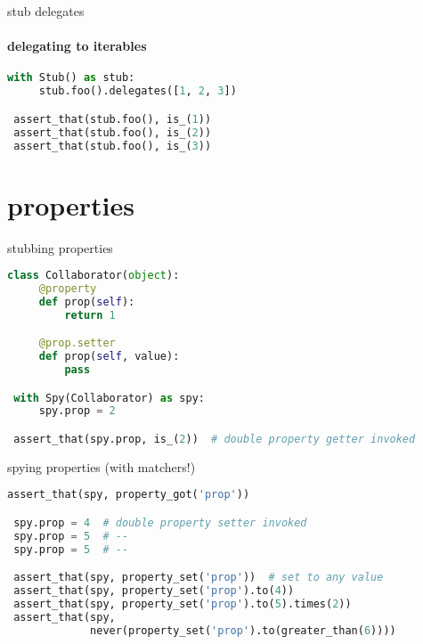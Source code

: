 \documentclass[11pt]{beamer}
\begin{document}
\begin{frame}[fragile]{stub delegates}
\framesubtitle{delegating to iterables}

\begin{exampleblock}{}
\begin{lstlisting}[language=Python]
 with Stub() as stub:
     stub.foo().delegates([1, 2, 3])

 assert_that(stub.foo(), is_(1))
 assert_that(stub.foo(), is_(2))
 assert_that(stub.foo(), is_(3))
\end{lstlisting}
\end{exampleblock}
\end{frame}

\section{properties}

\begin{frame}[fragile]{stubbing properties}

\begin{exampleblock}{}
\begin{lstlisting}[language=Python]
 class Collaborator(object):
     @property
     def prop(self):
         return 1

     @prop.setter
     def prop(self, value):
         pass

 with Spy(Collaborator) as spy:
     spy.prop = 2

 assert_that(spy.prop, is_(2))  # double property getter invoked
\end{lstlisting}
\end{exampleblock}
\end{frame}

\begin{frame}[fragile]{spying properties (with matchers!)}

\begin{exampleblock}{}
\begin{lstlisting}[language=Python]
 assert_that(spy, property_got('prop'))

 spy.prop = 4  # double property setter invoked
 spy.prop = 5  # --
 spy.prop = 5  # --

 assert_that(spy, property_set('prop'))  # set to any value
 assert_that(spy, property_set('prop').to(4))
 assert_that(spy, property_set('prop').to(5).times(2))
 assert_that(spy,
             never(property_set('prop').to(greater_than(6))))
\end{lstlisting}
\end{exampleblock}
\end{frame}
\end{document}
